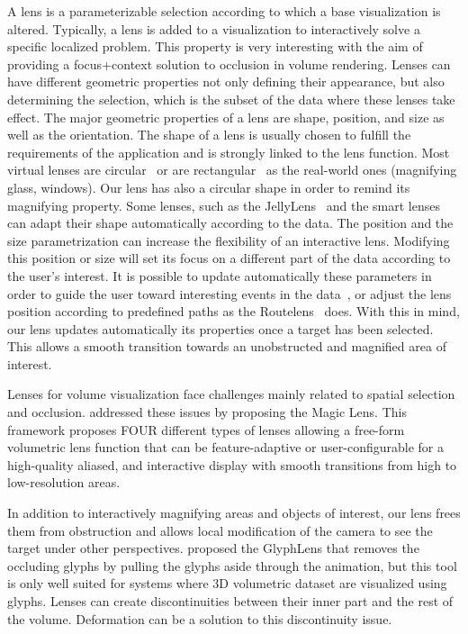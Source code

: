 A lens is a parameterizable selection according to which a base visualization is altered. Typically, a lens is added to a visualization to interactively solve a specific localized problem. This property is very interesting with the aim of providing a focus+context solution to occlusion in volume rendering. Lenses can have different geometric properties not only defining their appearance, but also determining the selection, which is the subset of the data where these lenses take effect. The major geometric properties of a lens are shape, position, and size as well as the orientation.
The shape of a lens is usually chosen to fulfill the requirements of the application and is strongly linked to the lens function. Most virtual lenses are circular~\cite{1648236} or are rectangular~\cite{Kincaid:2010:SFA:1907651.1907963} as the real-world ones (magnifying glass, windows). Our lens has also a circular shape in order to remind its magnifying property. Some lenses, such as the  JellyLens~\cite{Pindat:2012:JCA:2380116.2380150} and the smart lenses~\cite{Thiede2008} can adapt their shape automatically according to the data. 
The position and the size parametrization can increase the flexibility of an interactive lens.
Modifying this position or size will set its focus on a different part of the data according to the user's interest. It is possible to update automatically these parameters in order to guide the user toward interesting events in the data~\cite{Tominski:2011:ECU:2336207.2336211}, or adjust the lens position according to predefined paths as the Routelens~\cite{Alvina:2014:RER:2598153.2598200} does. With this in mind, our lens updates automatically its properties once a target has been selected. This allows a smooth transition towards an unobstructed and magnified area of interest. 

Lenses for volume visualization face challenges mainly related to spatial selection and occlusion. \cite{1532818} addressed these issues by proposing the Magic Lens. This framework proposes FOUR different types of lenses allowing a free-form volumetric lens function that
can be feature-adaptive or user-configurable for a high-quality
aliased, and interactive display with smooth transitions from high to
low-resolution areas.


In addition to interactively magnifying areas and objects of interest, our lens frees them from obstruction and allows local modification of the camera to see the target under other perspectives. \cite{7539643} proposed the GlyphLens that removes the occluding glyphs by pulling the glyphs aside through the animation, but this tool is only well suited for systems where 3D volumetric dataset are visualized using glyphs. Lenses can create discontinuities between their inner part and the rest of the volume. Deformation can be a solution to this discontinuity issue.   




